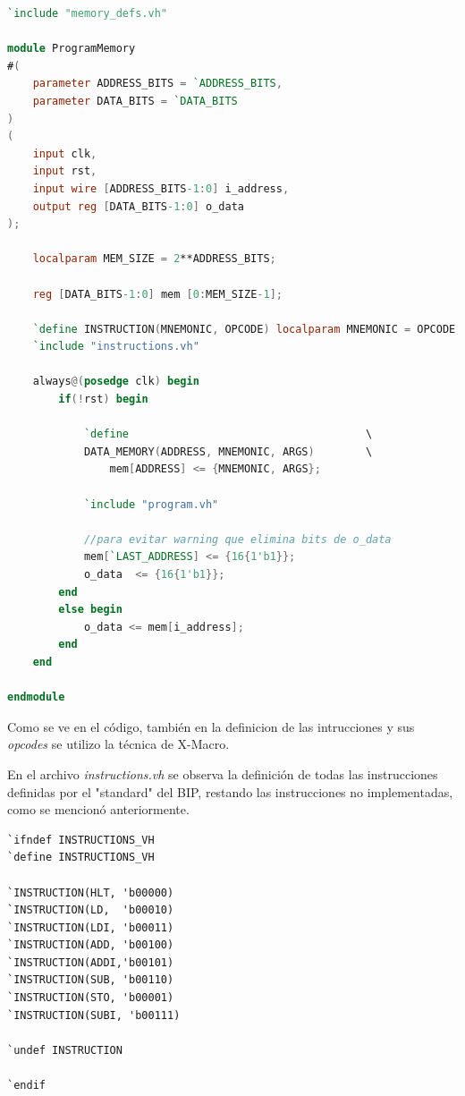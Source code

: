 \documentclass{article}
\begin{document}
\begin{shaded}
\begin{lstlisting}[language=Verilog]
`include "memory_defs.vh"

module ProgramMemory
#(
    parameter ADDRESS_BITS = `ADDRESS_BITS,
    parameter DATA_BITS = `DATA_BITS
)
(
    input clk,
    input rst,
    input wire [ADDRESS_BITS-1:0] i_address,
    output reg [DATA_BITS-1:0] o_data
);

    localparam MEM_SIZE = 2**ADDRESS_BITS;

    reg [DATA_BITS-1:0] mem [0:MEM_SIZE-1];

    `define INSTRUCTION(MNEMONIC, OPCODE) localparam MNEMONIC = OPCODE;
    `include "instructions.vh"

    always@(posedge clk) begin
        if(!rst) begin

            `define                                     \
            DATA_MEMORY(ADDRESS, MNEMONIC, ARGS)        \
                mem[ADDRESS] <= {MNEMONIC, ARGS};

            `include "program.vh"

            //para evitar warning que elimina bits de o_data
            mem[`LAST_ADDRESS] <= {16{1'b1}};
            o_data  <= {16{1'b1}};
        end
        else begin
            o_data <= mem[i_address];
        end
    end

endmodule
\end{lstlisting}
\end{shaded}

Como se ve en el código, también en la definicion de las intrucciones y sus
\textit{opcodes} se utilizo la técnica de X-Macro.

En el archivo \textit{instructions.vh} se observa la definición de todas las instrucciones
definidas por el "standard" del BIP, restando las instrucciones no implementadas, como
se mencionó anteriormente.

\begin{shaded}
\begin{lstlisting}
`ifndef INSTRUCTIONS_VH
`define INSTRUCTIONS_VH

`INSTRUCTION(HLT, 'b00000)
`INSTRUCTION(LD,  'b00010)
`INSTRUCTION(LDI, 'b00011)
`INSTRUCTION(ADD, 'b00100)
`INSTRUCTION(ADDI,'b00101)
`INSTRUCTION(SUB, 'b00110)
`INSTRUCTION(STO, 'b00001)
`INSTRUCTION(SUBI, 'b00111)

`undef INSTRUCTION

`endif
\end{lstlisting}
\end{shaded}
\end{document}
